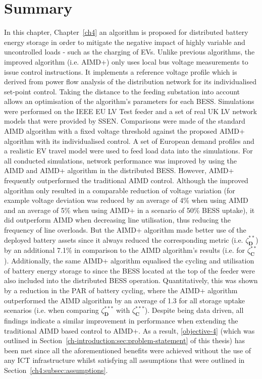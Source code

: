\section{Summary}
\label{ch4:sec:summary}

In this chapter, Chapter~\ref{ch4} an algorithm is proposed for distributed battery energy storage in order to mitigate the negative impact of highly variable and uncontrolled loads - such as the charging of EVs.
Unlike previous algorithms, the improved algorithm (i.e. AIMD+) only uses local bus voltage measurements to issue control instructions.
It implements a reference voltage profile which is derived from power flow analysis of the distribution network for its individualised set-point control.
Taking the distance to the feeding substation into account allows an optimisation of the algorithm's parameters for each BESS.
Simulations were performed on the IEEE EU LV Test feeder and a set of real UK LV network models that were provided by SSEN.
Comparisons were made of the standard AIMD algorithm with a fixed voltage threshold against the proposed AIMD+ algorithm with its individualised control.
A set of European demand profiles and a realistic EV travel model were used to feed load data into the simulations.
For all conducted simulations, network performance was improved by using the AIMD and AIMD+ algorithm in the distributed BESS.
However, AIMD+ frequently outperformed the traditional AIMD control.
Although the improved algorithm only resulted in a comparable reduction of voltage variation (for example voltage deviation was reduced by an average of 4\% when using AIMD and an average of 5\% when using AIMD+ in a scenario of 50\% BESS uptake), it did outperform AIMD when decreasing line utilisation, thus reducing the frequency of line overloads.
But the AIMD+ algorithm made better use of the deployed battery assets since it always reduced the corresponding metric (i.e. $\zeta^{**}_\textbf{D}$) by an additional 7.1\% in comparison to the AIMD algorithm's results (i.e. for $\zeta^{**}_\textbf{C}$).
Additionally, the same AIMD+ algorithm equalised the cycling and utilisation of battery energy storage to since the BESS located at the top of the feeder were also included into the distributed BESS operation.
Quantitatively, this was shown by a reduction in the PAR of battery cycling, where the AIMD+ algorithm outperformed the AIMD algorithm by an average of 1.3 for all storage uptake scenarios (i.e. when comparing $\zeta^{***}_\textbf{D}$ with $\zeta^{***}_\textbf{C}$).
Despite being data driven, all findings indicate a similar improvement in performance when extending the traditional AIMD based control to AIMD+.
As a result, \ref{objective-4} (which was outlined in Section~\ref{ch-introduction:sec:problem-statement} of this thesis) has been met since all the aforementioned benefits were achieved without the use of any ICT infrastructure whilst satisfying all assumptions that were outlined in Section~\ref{ch4:subsec:assumptions}.
